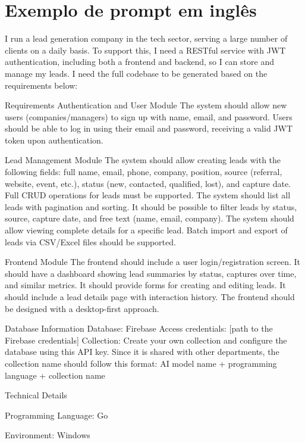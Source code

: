 \documentclass[12pt]{article}
\begin{document}
\section{Exemplo de prompt em inglês}
\label{apendice:prompt-en}

\begin{small}
\begin{MyVerbatim}
I run a lead generation company in the tech sector, serving a large number of clients on a daily basis.
To support this, I need a RESTful service with JWT authentication, including both a frontend and backend, so I can store and manage my leads.
I need the full codebase to be generated based on the requirements below:

Requirements
Authentication and User Module
The system should allow new users (companies/managers) to sign up with name, email, and password.
Users should be able to log in using their email and password, receiving a valid JWT token upon authentication.

Lead Management Module
The system should allow creating leads with the following fields: full name, email, phone, company, position, source (referral, website, event, etc.), status (new, contacted, qualified, lost), and capture date.
Full CRUD operations for leads must be supported.
The system should list all leads with pagination and sorting.
It should be possible to filter leads by status, source, capture date, and free text (name, email, company).
The system should allow viewing complete details for a specific lead.
Batch import and export of leads via CSV/Excel files should be supported.

Frontend Module
The frontend should include a user login/registration screen.
It should have a dashboard showing lead summaries by status, captures over time, and similar metrics.
It should provide forms for creating and editing leads.
It should include a lead details page with interaction history.
The frontend should be designed with a desktop-first approach.

Database Information
Database: Firebase
Access credentials: [path to the Firebase credentials]
Collection: Create your own collection and configure the database using this API key. Since it is shared with other departments, the collection name should follow this format:
AI model name + programming language + collection name

Technical Details

Programming Language: Go

Environment: Windows
\end{MyVerbatim}
\end{small}
\end{document}
